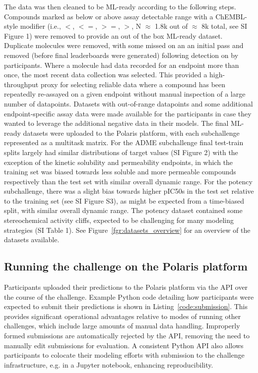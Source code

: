 \documentclass[journal=jcim,manuscript=article]{achemso}
\begin{document}
The data was then cleaned to be ML-ready according to the following steps. Compounds marked as below or above assay detectable range with a ChEMBL\cite{zdrazil_2024_chembl}-style modifier (i.e., $<$, $<=$, $>=$, $>$, N $\approx$ 1.8k out of $\approx$ 8k total, see SI Figure 1) were removed to provide an out of the box ML-ready dataset.  Duplicate molecules were removed, with some missed on an an initial pass and removed (before final leaderboards were generated) following detection on by participants. Where a molecule had data recorded for an endpoint more than once, the most recent data collection was selected. This provided a high-throughput proxy for selecting reliable data where a compound has been repeatedly re-assayed on a given  endpoint without manual inspection of a large number of datapoints. Datasets with out-of-range datapoints and some additional endpoint-specific assay data were made available for the participants in case they wanted to leverage the additional negative data in their models. The final ML-ready datasets were uploaded to the Polaris platform, with each subchallenge represented as a multitask matrix. For the ADME subchallenge final test-train splits largely had similar distributions of target values (SI Figure 2) with the exception of the kinetic solubility and permeability endpoints, in which the training set was biased towards less soluble and more permeable compounds respectively than the test set with similar overall dynamic range. For the potency subchallenge, there was a slight bias towards higher pIC50s in the test set relative to the training set (see SI Figure S3), as might be expected from a time-biased split, with similar overall dynamic range. The potency dataset contained some stereochemical activity cliffs, expected to be challenging for many modeling strategies (SI Table 1). See Figure~\ref{fgr:datasets_overview} for an overview of the datasets available.

\subsection{Running the challenge on the Polaris platform}

Participants uploaded their predictions to the Polaris platform via the API over the course of the challenge. Example Python code detailing how participants were expected to submit their predictions is shown in Listing~\ref{code:submission}. This provides significant operational advantages relative to modes of running other challenges, which include large amounts of manual data handling. Improperly formed submissions are automatically rejected by the API, removing the need to manually edit submissions for evaluation. A consistent Python API also allows participants to colocate their modeling efforts with submission to the challenge infrastructure, e.g. in a Jupyter notebook\cite{kluyver_2016_jupyter}, enhancing reproducibility.
\end{document}
